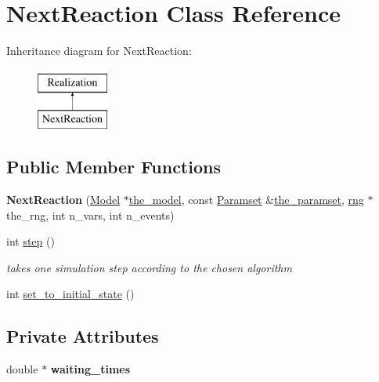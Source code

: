 \hypertarget{class_next_reaction}{}\section{Next\+Reaction Class Reference}
\label{class_next_reaction}
Inheritance diagram for Next\+Reaction\+:\begin{figure}[H]
\begin{center}
\leavevmode
\includegraphics[height=2.000000cm]{class_next_reaction}
\end{center}
\end{figure}
\subsection*{Public Member Functions}
\begin{DoxyCompactItemize}
\item 
\mbox{\label{class_next_reaction_ac08695146983c863c3edf3bb4e61d9f9}} 
{\bfseries Next\+Reaction} (\hyperlink{class_model}{Model} $\ast$\hyperlink{class_realization_a47ec1d062b8caee874b08c1a17d6aeeb}{the\+\_\+model}, const \hyperlink{class_paramset}{Paramset} \&\hyperlink{class_realization_a119bb29de88929bc51bc1b329473a94b}{the\+\_\+paramset}, \hyperlink{classrng}{rng} $\ast$the\+\_\+rng, int n\+\_\+vars, int n\+\_\+events)
\item 
\mbox{\label{class_next_reaction_a2c1502879c76efe398c2947056936725}} 
int \hyperlink{class_next_reaction_a2c1502879c76efe398c2947056936725}{step} ()
\begin{DoxyCompactList}\small\item\em takes one simulation step according to the chosen algorithm \end{DoxyCompactList}\item 
int \hyperlink{class_next_reaction_a0cc63c4ec9fe3f338472fff302f6d746}{set\+\_\+to\+\_\+initial\+\_\+state} ()
\end{DoxyCompactItemize}
\subsection*{Private Attributes}
\begin{DoxyCompactItemize}
\item 
\mbox{\label{class_next_reaction_a8a7d82a004db70828dd732bf57cf35b6}} 
double $\ast$ {\bfseries waiting\+\_\+times}
\end{DoxyCompactItemize}
